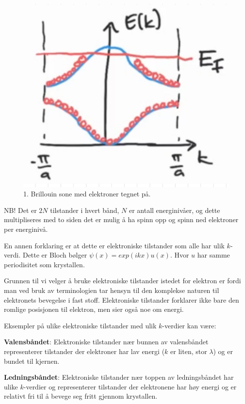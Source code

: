 \begin{figure}[!htb]
    \centering
    \includegraphics[scale=0.2]{Bilder/SamtaleTema6/infoBD.jpeg}
    \caption{1. Brillouin sone med elektroner tegnet på.}
    \label{fig:infoBD}
\end{figure}

NB! Det er $2N$ tilstander i hvert bånd, $N$ er antall energinivåer, og dette multipliseres med to siden det er mulig å ha spinn opp og spinn ned elektroner per energinivå.

En annen forklaring er at dette er elektroniske tilstander som alle har ulik $k$-verdi. Dette er Bloch bølger $\psi(x)=exp(ikx)u(x)$. Hvor $u$ har samme periodisitet som krystallen. 

Grunnen til vi velger å bruke elektroniske tilstander istedet for elektron er fordi man ved bruk av terminologien tar hensyn til den komplekse naturen til elektronets bevegelse i fast stoff. Elektroniske tilstander forklarer ikke bare den romlige posisjonen til elektron, men sier også noe om energi.

Eksempler på ulike elektroniske tilstander med ulik $k$-verdier kan være: 

\textbf{Valensbåndet}: Elektroniske tilstander nær bunnen av valensbåndet representerer tilstander der elektroner har lav energi ($k$ er liten, stor $\lambda$) og er bundet til kjernen.

\textbf{Ledningsbåndet}: Elektroniske tilstander nær toppen av ledningsbåndet har ulike $k$-verdier og representerer tilstander der elektronene har høy energi og er relativt fri til å bevege seg fritt gjennom krystallen.

